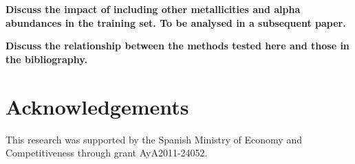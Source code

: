 \documentclass[a4paper,fleqn,usenatbib]{mnras}
\begin{document}
{{{{\bf Discuss the impact of including other metallicities and alpha
  abundances in the training set. To be analysed in a subsequent
  paper.}

{\bf Discuss the relationship between the methods tested here and
  those in the bibliography.}

\section*{Acknowledgements}
This research was supported by the Spanish Ministry of Economy and
Competitiveness through grant AyA2011-24052.










\appendix

}}}
\end{document}
